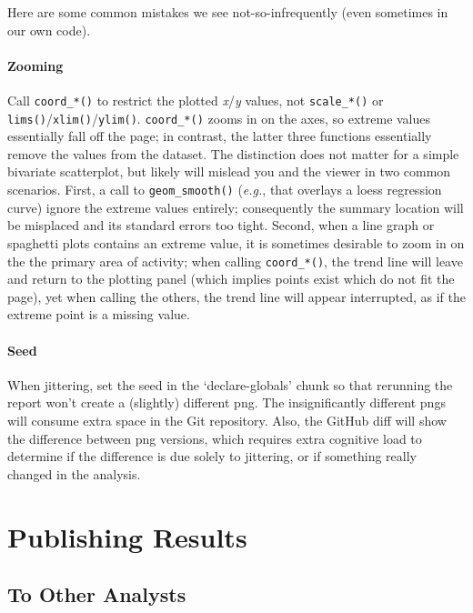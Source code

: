 \documentclass[
]{book}
\begin{document}
Here are some common mistakes we see not-so-infrequently (even sometimes in our own code).

\hypertarget{style-ggplot-zoom}{%
\subsubsection{Zooming}\label{style-ggplot-zoom}}

Call \texttt{coord\_*()} to restrict the plotted \emph{x}/\emph{y} values, not \texttt{scale\_*()} or \texttt{lims()}/\texttt{xlim()}/\texttt{ylim()}. \texttt{coord\_*()} zooms in on the axes, so extreme values essentially fall off the page; in contrast, the latter three functions essentially remove the values from the dataset. The distinction does not matter for a simple bivariate scatterplot, but likely will mislead you and the viewer in two common scenarios. First, a call to \texttt{geom\_smooth()} (\emph{e.g.}, that overlays a loess regression curve) ignore the extreme values entirely; consequently the summary location will be misplaced and its standard errors too tight. Second, when a line graph or spaghetti plots contains an extreme value, it is sometimes desirable to zoom in on the the primary area of activity; when calling \texttt{coord\_*()}, the trend line will leave and return to the plotting panel (which implies points exist which do not fit the page), yet when calling the others, the trend line will appear interrupted, as if the extreme point is a missing value.

\hypertarget{style-ggplot-seed}{%
\subsubsection{Seed}\label{style-ggplot-seed}}

When jittering, set the seed in the `declare-globals' chunk so that rerunning the report won't create a (slightly) different png. The insignificantly different pngs will consume extra space in the Git repository. Also, the GitHub diff will show the difference between png versions, which requires extra cognitive load to determine if the difference is due solely to jittering, or if something really changed in the analysis.

\hypertarget{publication}{%
\chapter{Publishing Results}\label{publication}}

\hypertarget{to-other-analysts}{%
\section{To Other Analysts}\label{to-other-analysts}}
\end{document}
